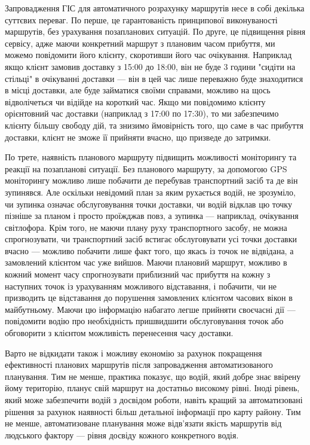 Запровадження ГІС для автоматичного розрахунку маршрутів несе в собі декілька суттєвих переваг. По перше, це гарантованість принципової виконуваності маршрутів, без урахування позапланових ситуацій. По друге, це підвищення рівня сервісу, адже маючи конкретний маршрут з плановим часом прибуття, ми можемо повідомити його клієнту, скоротивши його час очікування. Наприклад якщо клієнт замовив доставку з 15:00 до 18:00, він не буде 3 години "сидіти на стільці" в очікуванні доставки --- він в цей час лише переважно буде знаходитися в місці доставки, але буде займатися своїми справами, можливо на щось відволічеться чи відійде на короткий час. Якщо ми повідомимо клієнту орієнтовний час доставки (наприклад з 17:00 по 17:30), то ми забезпечимо клієнту більшу свободу дій, та знизимо ймовірність того, що саме в час прибуття доставки, клієнт не зможе її прийняти вчасно, що призведе до затримки.

По трете, наявність планового маршруту підвищить можливості моніторингу та реакції на позапланові ситуації. Без планового маршруту, за допомогою GPS моніторингу можливо лише побачити де перебував транспортний засіб та де він зупинявся. Але оскільки невідомий план за яким рухається водій, не зрозуміло, чи зупинка означає обслуговування точки доставки, чи водій відклав цю точку пізніше за планом і просто проїжджав повз, а зупинка --- наприклад, очікування світлофора. Крім того, не маючи плану руху транспортного засобу, не можна спрогнозувати, чи транспортний засіб встигає обслуговувати усі точки доставки вчасно --- можливо побачити лише факт того, що якась із точок не відвідана, а замовлений клієнтом час уже вийшов. Маючи плановий маршрут, можливо в кожний момент часу спрогнозувати приблизний час прибуття на кожну з наступних точок із урахуванням можливого відставання, і побачити, чи не призводить це відставання до порушення замовлених клієнтом часових вікон в майбутньому. Маючи цю інформацію набагато легше прийняти своєчасні дії --- повідомити водію про необхідність пришвидшити обслуговування точок або обговорити з клієнтом можливість перенесення часу доставки.  

Варто не відкидати також і можливу економію за рахунок покращення ефективності планових маршрутів після запровадження автоматизованого планування. Тим не менше, практика показує, що водій, який добре знає ввірену йому територію, планує свій маршрут на достатньо високому рівні. Іноді рівень, який може забезпечити водій з досвідом роботи, навіть кращий за автоматизовані рішення за рахунок наявності більш детальної інформації про карту району. Тим не менше, автоматизоване планування може відв'язати якість маршрутів від людського фактору --- рівня досвіду кожного конкретного водія.

